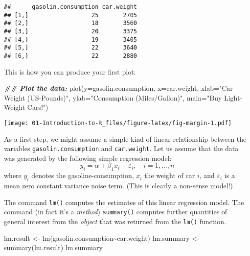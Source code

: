 \documentclass[
]{book}
\newenvironment{Shaded}{\begin{snugshade}}{\end{snugshade}}
\newcommand{\AttributeTok}[1]{\textcolor[rgb]{0.77,0.63,0.00}{#1}}
\newcommand{\DocumentationTok}[1]{\textcolor[rgb]{0.56,0.35,0.01}{\textbf{\textit{#1}}}}
\newcommand{\FunctionTok}[1]{\textcolor[rgb]{0.00,0.00,0.00}{#1}}
\newcommand{\NormalTok}[1]{#1}
\newcommand{\OtherTok}[1]{\textcolor[rgb]{0.56,0.35,0.01}{#1}}
\newcommand{\SpecialCharTok}[1]{\textcolor[rgb]{0.00,0.00,0.00}{#1}}
\newcommand{\StringTok}[1]{\textcolor[rgb]{0.31,0.60,0.02}{#1}}
\begin{document}
\begin{verbatim}
##      gasolin.consumption car.weight
## [1,]                  25       2705
## [2,]                  18       3560
## [3,]                  20       3375
## [4,]                  19       3405
## [5,]                  22       3640
## [6,]                  22       2880
\end{verbatim}

\hfill\break

This is how you can produce your first plot:

\begin{Shaded}
\begin{Highlighting}[]
\DocumentationTok{\#\# Plot the data:}
\FunctionTok{plot}\NormalTok{(}\AttributeTok{y=}\NormalTok{gasolin.consumption, }\AttributeTok{x=}\NormalTok{car.weight, }
     \AttributeTok{xlab=}\StringTok{"Car{-}Weight (US{-}Pounds)"}\NormalTok{, }
     \AttributeTok{ylab=}\StringTok{"Consumption (Miles/Gallon)"}\NormalTok{, }
     \AttributeTok{main=}\StringTok{"Buy Light{-}Weight Cars!"}\NormalTok{)}
\end{Highlighting}
\end{Shaded}

\texttt{[image: 01-Introduction-to-R\_files/figure-latex/fig-margin-1.pdf]}

\hfill\break

As a first step, we might assume a simple kind of linear relationship between the variables \texttt{gasolin.consumption} and \texttt{car.weight}. Let us assume that the data was generated by the following simple regression model:
\[
y_i=\alpha+\beta_1 x_i+\varepsilon_i,\quad i=1,\dots,n
\]
where \(y_i\) denotes the gasoline-consumption, \(x_i\) the weight of car \(i\), and \(\varepsilon_i\) is a mean zero constant variance noise term. (This is clearly a non-sense model!)

The command \texttt{lm()} computes the estimates of this linear regression model. The command (in fact it's a \emph{method}) \texttt{summary()} computes further quantities of general interest from the \emph{object} that was returned from the \texttt{lm()} function.

\begin{Shaded}
\begin{Highlighting}[]
\NormalTok{lm.result   }\OtherTok{\textless{}{-}} \FunctionTok{lm}\NormalTok{(gasolin.consumption}\SpecialCharTok{\textasciitilde{}}\NormalTok{car.weight)}
\NormalTok{lm.summary  }\OtherTok{\textless{}{-}} \FunctionTok{summary}\NormalTok{(lm.result)}
\NormalTok{lm.summary}
\end{Highlighting}
\end{Shaded}
\end{document}
